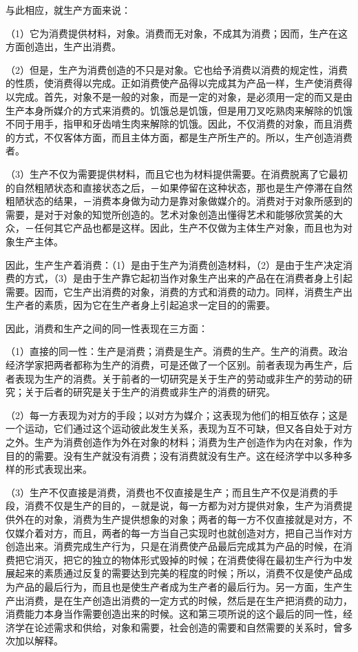 \documentclass[a4paper,twoside,12pt]{ctexart}
\begin{document}
与此相应，就生产方面来说：

（1）它为消费提供材料，对象。消费而无对象，不成其为消费；因而，生产在这方面创造出，生产出消费。

（2）但是，生产为消费创造的不只是对象。它也给予消费以消费的规定性，消费的性质，使消费得以完成。正如消费使产品得以完成其为产品一样，生产使消费得以完成。首先，对象不是一般的对象，而是一定的对象，是必须用一定的而又是由生产本身所媒介的方式来消费的。饥饿总是饥饿，但是用刀叉吃熟肉来解除的饥饿不同于用手，指甲和牙齿啃生肉来解除的饥饿。因此，不仅消费的对象，而且消费的方式，不仅客体方面，而且主体方面，都是生产所生产的。所以，生产创造消费者。

（3）生产不仅为需要提供材料，而且它也为材料提供需要。在消费脱离了它最初的自然粗陋状态和直接状态之后，－如果停留在这种状态，那也是生产停滞在自然粗陋状态的结果，－消费本身做为动力是靠对象做媒介的。消费对于对象所感到的需要，是对于对象的知觉所创造的。艺术对象创造出懂得艺术和能够欣赏美的大众，－任何其它产品也都是这样。因此，生产不仅做为主体生产对象，而且也为对象生产主体。

因此，生产生产着消费：（1）是由于生产为消费创造材料，（2）是由于生产决定消费的方式，（3）是由于生产靠它起初当作对象生产出来的产品在在消费者身上引起需要。因而，它生产出消费的对象，消费的方式和消费的动力。同样，消费生产出生产者的素质，因为它在生产者身上引起追求一定目的的需要。

因此，消费和生产之间的同一性表现在三方面：

（1）直接的同一性：生产是消费；消费是生产。消费的生产。生产的消费。政治经济学家把两者都称为生产的消费，可是还做了一个区别。前者表现为再生产，后者表现为生产的消费。关于前者的一切研究是关于生产的劳动或非生产的劳动的研究；关于后者的研究是关于生产的消费或非生产的消费的研究。

（2）每一方表现为对方的手段；以对方为媒介；这表现为他们的相互依存；这是一个运动，它们通过这个运动彼此发生关系，表现为互不可缺，但又各自处于对方之外。生产为消费创造作为外在对象的材料；消费为生产创造作为内在对象，作为目的的需要。没有生产就没有消费；没有消费就没有生产。这在经济学中以多种多样的形式表现出来。

（3）生产不仅直接是消费，消费也不仅直接是生产；而且生产不仅是消费的手段，消费不仅是生产的目的，－就是说，每一方都为对方提供对象，生产为消费提供外在的对象，消费为生产提供想象的对象；两者的每一方不仅直接就是对方，不仅媒介着对方，而且，两者的每一方当自己实现时也就创造对方，把自己当作对方创造出来。消费完成生产行为，只是在消费使产品最后完成其为产品的时候，在消费把它消灭，把它的独立的物体形式毁掉的时候；在消费使得在最初生产行为中发展起来的素质通过反复的需要达到完美的程度的时候；所以，消费不仅是使产品成为产品的最后行为，而且也是使生产者成为生产者的最后行为。另一方面，生产生产出消费，是在生产创造出消费的一定方式的时候，然后是在生产把消费的动力，消费能力本身当作需要创造出来的时候。这和第三项所说的这个最后的同一性，经济学在论述需求和供给，对象和需要，社会创造的需要和自然需要的关系时，曾多次加以解释。
\end{document}
